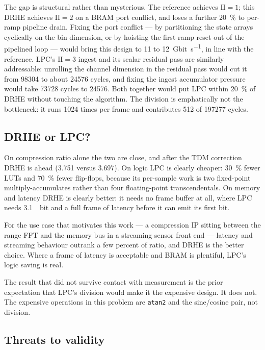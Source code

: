 \documentclass[10pt,twocolumn]{article}
\begin{document}
The gap is structural rather than mysterious. The reference achieves
$\mathrm{II}=1$; this DRHE achieves $\mathrm{II}=2$ on a BRAM port conflict,
and loses a further \SI{20}{\percent} to per-ramp pipeline drain. Fixing the
port conflict --- by partitioning the state arrays cyclically on the bin
dimension, or by hoisting the first-ramp reset out of the pipelined loop ---
would bring this design to \SI{11}{} to \SI{12}{Gbit\per\second}, in line with
the reference. LPC's $\mathrm{II}=3$ ingest and its scalar residual pass are
similarly addressable: unrolling the channel dimension in the residual pass
would cut it from \num{98304} to about \num{24576} cycles, and fixing the
ingest accumulator pressure would take \num{73728} cycles to \num{24576}. Both
together would put LPC within \SI{20}{\percent} of DRHE without touching the
algorithm. The division is emphatically not the bottleneck: it runs \num{1024}
times per frame and contributes \num{512} of \num{197277} cycles.

\subsection{DRHE or LPC?}

On compression ratio alone the two are close, and after the TDM correction DRHE
is ahead (\num{3.751} versus \num{3.697}). On logic LPC is clearly cheaper:
\SI{30}{\percent} fewer LUTs and \SI{70}{\percent} fewer flip-flops, because
its per-sample work is two fixed-point multiply-accumulates rather than four
floating-point transcendentals. On memory and latency DRHE is clearly better:
it needs no frame buffer at all, where LPC needs \SI{3.1}{\mebi bit} and a full
frame of latency before it can emit its first bit.

For the use case that motivates this work --- a compression IP sitting between
the range FFT and the memory bus in a streaming sensor front end --- latency and
streaming behaviour outrank a few percent of ratio, and DRHE is the better
choice. Where a frame of latency is acceptable and BRAM is plentiful, LPC's
logic saving is real.

The result that did not survive contact with measurement is the prior
expectation that LPC's division would make it the expensive design. It does
not. The expensive operations in this problem are \texttt{atan2} and the
sine/cosine pair, not division.

\subsection{Threats to validity}
\end{document}
